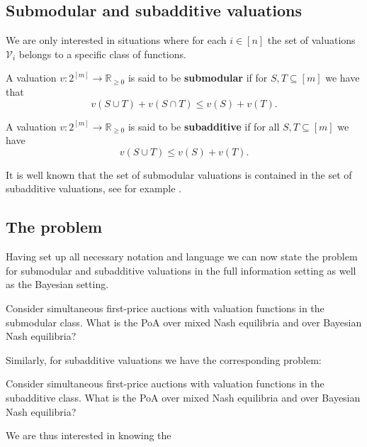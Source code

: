
\subsection{Submodular and subadditive valuations} %
\label{sub:Submodular valuations}
We are only interested in situations where for each $ i \in [n] $ the set of valuations $ \mathcal{V}_i $ belongs to a specific class of functions.
\begin{definition}
  A valuation $ v: 2^{[m]} \to \mathbb{R}_{\geq 0} $ is said to be \textbf{submodular} if for $ S,T \subseteq [m] $ we have that
  \begin{equation}
    v(S \cup T) + v(S \cap T) \leq v(S) + v(T)
    \label{eq:submodular}
  .\end{equation}
\end{definition}
\begin{definition}
  A valuation $ v: 2^{[m]} \to \mathbb{R}_{\geq 0} $ is said to be \textbf{subadditive} if for all $ S,T \subseteq [m] $ we have
  \begin{equation}
    v(S \cup T ) \leq v(S) + v(T).
    \label{eq:subadditive}
  \end{equation}
\end{definition}
It is well known that the set of submodular valuations is contained in the set of subadditive valuations, see for example \cite{doi:10.1137/070680977}.

\subsection{The problem} %
\label{sub:The problem}
Having set up all necessary notation and language we can now state the problem for submodular and subadditive valuations in the full information setting as well as the Bayesian setting.
\begin{problem}
  Consider simultaneous first-price auctions with valuation functions in the submodular class. What is the PoA over mixed Nash equilibria and over Bayesian Nash equilibria?
\end{problem}
Similarly, for subadditive valuations we have the corresponding problem:
\begin{problem}
  Consider simultaneous first-price auctions with valuation functions in the subadditive class. What is the PoA over mixed Nash equilibria and over Bayesian Nash equilibria?
\end{problem}
We are thus interested in knowing the
